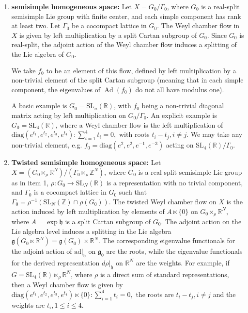 \documentclass[11pt]{amsart}
\numberwithin{equation}{section}
\newcommand{\R}{\mathbb{R}}
\theoremstyle{plain}
\begin{document}
\begin{enumerate}
    \item \textbf{semisimple homogeneous space:} Let \(X = G_0 / \Gamma_0\), where \(G_0\) is a real-split semisimple Lie group with finite center, and each simple component has rank at least two. Let \(\Gamma_0\) be a cocompact lattice in \(G_0\). The Weyl chamber flow in \(X\) is given by left multiplication by a split Cartan subgroup of \(G_0\). Since $G_0$ is real-split, the adjoint action of the Weyl chamber flow induces a splitting of the Lie algebra of $G_0$. 
    
    We take \(f_0\) to be an element of this flow, defined by left multiplication by a non-trivial element of the split Cartan subgroup (meaning that in each simple component, the eigenvalues of \(\operatorname{Ad}(f_0)\) do not all have modulus one). 

    A basic example is \(G_0 = \mathrm{SL}_n(\mathbb{R})\), with \(f_0\) being a non-trivial diagonal matrix acting by left multiplication on \(G_0/\Gamma_0\). An explicit example is \(G_0 = \mathrm{SL}_4(\mathbb{R})\), where a Weyl chamber flow is the left multiplication of $\mathrm{diag}(e^{t_1}, e^{t_2}, e^{t_3}, e^{t_4}): \sum_{i=1}^4 t_i=0,$ with roots $t_i-t_j, i\neq j$. We may take any non-trivial element, e.g. \(f_0 = \mathrm{diag}(e^{2}, e^{2}, e^{-1}, e^{-3})\) acting on \(\mathrm{SL}_4(\mathbb{R})/\Gamma_0\). 
  

    \item \textbf{Twisted semisimple homogeneous space:} Let \(X = (G_0 \ltimes_\rho \mathbb{R}^N) / (\Gamma_0 \ltimes_\rho \mathbb{Z}^N)\), where \(G_0\) is a real-split semisimple Lie group as in item 1, \(\rho: G_0 \to \mathrm{SL}_N(\mathbb{R})\) is a representation with no trivial component, and \(\Gamma_0\) is a cocompact lattice in \(G_0\) such that \(\Gamma_0=\rho^{-1}(\mathrm{SL}_N(\mathbb{Z})\cap \rho(G_0))\). The twisted Weyl chamber flow on \(X\) is the action induced by left multiplication by elements of \(A \ltimes \{0\}\) on \(G_0 \ltimes_\rho \mathbb{R}^N\), where \(A=\exp \mathfrak h\) is a split Cartan subgroup of \(G_0\). The adjoint action on the Lie algebra level induces a splitting in the Lie algebra $\mathfrak{g}(G_0\ltimes \R^N)=\mathfrak{g}(G_0)\times \R^N$. The corresponding eigenvalue functionals for the adjoint action of $\mathrm{ad}|_{\mathfrak h}$ on
\(\mathfrak g_0\) are the roots, while the eigenvalue functionals for the
derived representation \(d\rho|_{\mathfrak h}\) on \(\mathbb R^N\) are the weights. For example, if $G=\mathrm {SL}_4(\R)\ltimes_\rho \R^N$, where $\rho$ is a direct sum of standard representations, then a Weyl chamber flow is given by $\mathrm{diag}(e^{t_1}, e^{t_2}, e^{t_3}, e^{t_4})\ltimes \{0\}: \sum_{i=1}^4 t_i=0,$ the roots are $t_i-t_j, i\neq j$ and the weights are $t_i, 1\le i\le 4$.
    

\end{enumerate}
\end{document}
